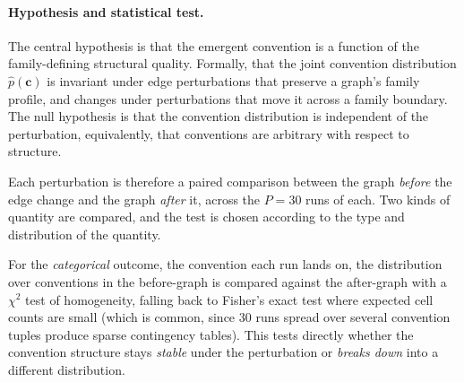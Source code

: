 \documentclass[a4paper,twoside,12pt]{report}
\begin{document}
    \paragraph{Hypothesis and statistical test.}
    The central hypothesis is that the emergent convention is a function of the
    family-defining structural quality.
    Formally, that the joint convention distribution
    $\hat{p}(\mathbf{c})$ is invariant under edge perturbations that preserve a
    graph's family profile, and changes under perturbations that move it across a
    family boundary. The null hypothesis is that the convention distribution is
    independent of the perturbation, equivalently, that conventions are arbitrary
    with respect to structure.
    
    Each perturbation is therefore a paired comparison between the graph
    \emph{before} the edge change and the graph \emph{after} it, across the
    $P = 30$ runs of each. Two kinds of quantity are compared, and the test is
    chosen according to the type and distribution of the quantity.
    
    For the \emph{categorical} outcome, the convention each run lands on, the
    distribution over conventions in the before-graph is compared against the
    after-graph with a $\chi^2$ test of homogeneity, falling back to Fisher's
    exact test where expected cell counts are small (which is common, since 30
    runs spread over several convention tuples produce sparse contingency
    tables). This tests directly whether the convention structure stays
    \emph{stable} under the perturbation or \emph{breaks down} into a different
    distribution.
    
    
\end{document}
